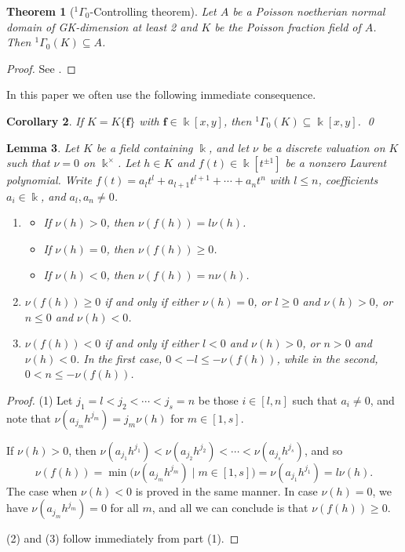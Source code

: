 \documentclass[12pt]{amsart}
\theoremstyle{plain}
\newtheorem{theorem}{Theorem}
\newtheorem{lemma}[theorem]{Lemma}
\newtheorem{corollary}[theorem]{Corollary}
\numberwithin{theorem}{section}
\numberwithin{equation}{theorem}
\theoremstyle{definition}
\newcommand \bff {{\mathbf{f}}}
\newcommand \kx {\Bbbk^\times}
\begin{document}
\begin{theorem}[${^{1}\Gamma_{0}}$-Controlling theorem]
\label{zzthm3.8}
Let $A$ be a Poisson noetherian normal domain of 
GK-dimension at least 2 and $K$ be the Poisson 
fraction field of $A$. Then ${^{1}\Gamma_{0}}(K)\subseteq A$.
\end{theorem}

\begin{proof}
See \cite[Theorem 4.3(2)]{HTWZ1}.
\end{proof}

In this paper we often use the following 
immediate consequence.

\begin{corollary}  
\label{zzcor3.9} 
If $K = K\{\bff\}$ with $\bff \in 
\Bbbk[x,y]$, then ${}^1\Gamma_0(K) 
\subseteq \Bbbk[x,y]$.
\qed\end{corollary}

\begin{lemma} 
\label{zzlem3.10}
Let $K$ be a field containing $\Bbbk$, and let $\nu$ be a discrete valuation on $K$ such that $\nu = 0$ on $\kx$. 
Let $h\in K$ and $f(t)\in \Bbbk[t^{\pm 1}]$ be a nonzero
Laurent polynomial.  Write $f(t) = a_l t^l + a_{l+1} t^{l+1} + \cdots + a_n t^n$ with 
$l \le n$, coefficients $a_i \in \Bbbk$, and $a_l,a_n \ne 0$.
\begin{enumerate}
\item[(1)]
\begin{itemize}
\item 
If $\nu(h) > 0$, then $\nu(f(h)) = l \nu(h)$.
\item 
If $\nu(h) = 0$, then $\nu(f(h)) \ge 0$.
\item 
If $\nu(h) < 0$, then $\nu(f(h)) = n \nu(h)$.
\end{itemize}
\item[(2)]
$\nu(f(h)) \ge 0$ if and only if either $\nu(h) = 0$, or $l\geq 0$ and 
$\nu(h) > 0$, or $n\leq 0$ and $\nu(h) < 0$.
\item[(3)]
$\nu(f(h)) < 0$ if and only if either $l< 0$ and $\nu(h)>0$,  or $n>0$ and $\nu(h)<0$.  In the first case,  $0< -l \leq -\nu(f(h))$, while in the second, $0<n\le -\nu(f(h))$. 
\end{enumerate}
\end{lemma}

\begin{proof}
(1) Let $j_1 = l < j_2 < \cdots < j_s = n$ be those 
$i \in [l,n]$ such that $a_i \ne 0$, and note that 
$\nu(a_{j_m} h^{j_m}) = j_m\nu(h)$ for $m \in [1,s]$.

If $\nu(h) > 0$, then $\nu(a_{j_1} h^{j_1}) < 
\nu(a_{j_2} h^{j_2}) < \cdots < \nu(a_{j_s} h^{j_s})$, and so 
$$\nu(f(h)) = \min
\bigl( \nu(a_{j_m} h^{j_m}) \mid m \in [1,s] \bigr) 
= \nu(a_{j_1} h^{j_1}) = l \nu(h).$$
The case when $\nu(h) < 0$ is proved in the same manner. In 
case $\nu(h) = 0$, we have $\nu(a_{j_m} h^{j_m}) = 0$ for all 
$m$, and all we can conclude is that $\nu(f(h)) \ge 0$.

(2) and (3) follow immediately from part (1).
\end{proof}
\end{document}
